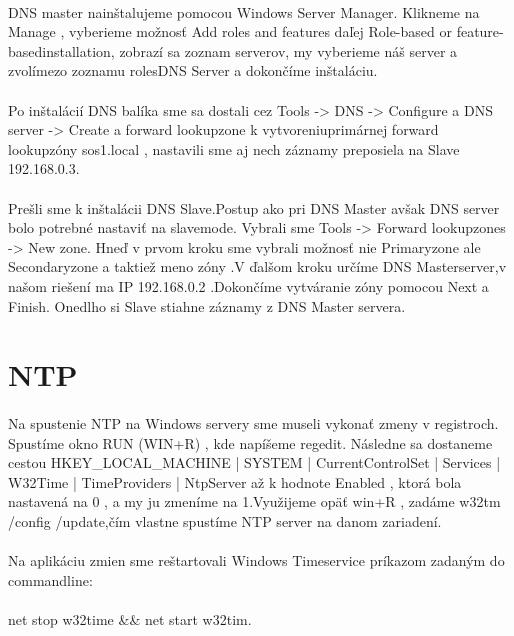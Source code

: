 \paragraph{}
DNS master nainštalujeme pomocou Windows Server Manager. Klikneme na Manage , vyberieme možnosť Add roles and features daľej Role-based or feature-basedinstallation, zobrazí sa  zoznam serverov, my vyberieme náš server a zvolímezo zoznamu rolesDNS Server a dokončíme inštaláciu.
\paragraph{}
Po inštalácií DNS balíka sme sa dostali cez Tools -\textgreater{} DNS -\textgreater{} Configure a DNS server -\textgreater{} Create a forward lookupzone k vytvoreniuprimárnej forward lookupzóny sos1.local , nastavili sme aj  nech záznamy preposiela na Slave 192.168.0.3.
\paragraph{}
Prešli sme k inštalácii DNS Slave.Postup ako pri DNS Master avšak  DNS server bolo potrebné nastaviť na slavemode. Vybrali sme  Tools -\textgreater{} Forward lookupzones -\textgreater{} New zone. Hneď v prvom kroku sme vybrali  možnosť nie Primaryzone ale Secondaryzone a taktiež  meno zóny .V ďalšom kroku určíme DNS Masterserver,v našom riešení ma  IP 192.168.0.2 .Dokončíme vytváranie zóny pomocou Next a Finish. Onedlho si Slave stiahne záznamy z DNS Master servera.

\section{NTP}
\paragraph{}
Na spustenie NTP na Windows servery sme museli vykonať zmeny v registroch. Spustíme okno RUN  (WIN+R) , kde napíšeme regedit. Následne sa dostaneme cestou HKEY\_LOCAL\_MACHINE | SYSTEM | CurrentControlSet | Services | W32Time | TimeProviders | NtpServer	až k hodnote Enabled , ktorá bola nastavená na 0 , a my ju zmeníme na 1.Využijeme opäť win+R , zadáme w32tm /config /update,čím vlastne spustíme NTP server na danom zariadení.
\paragraph{}
Na aplikáciu  zmien sme reštartovali Windows Timeservice príkazom zadaným do commandline:
\\
\\
net stop w32time \&\& net start w32tim.

